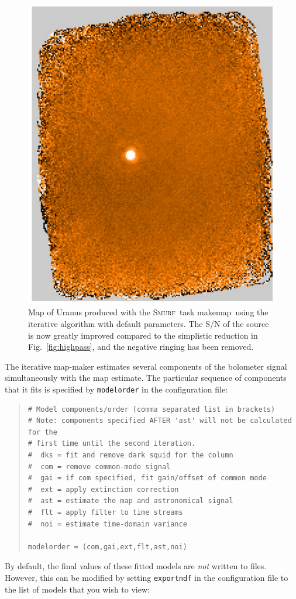 \documentclass[twoside,11pt]{article}
\newcommand{\xref}[3]{#1}
\renewcommand{\_}{\texttt{\symbol{95}}}
\newenvironment{myquote}{\begin{quote}\begin{small}}{\end{small}\end{quote}}
\newcommand{\smurf}{\xref{\textsc{Smurf}}{sun258}{}}
\newcommand{\task}[1]{\textsf{#1}}
\newcommand{\makemap}{\xref{\task{makemap}}{sun258}{MAKEMAP}}
\begin{document}
\begin{figure}
\begin{center}
\includegraphics[width=0.5\linewidth]{sc19_map_iterate}
\caption{Map of Uranus produced with the \smurf\ task \makemap\ using
  the iterative algorithm with default parameters. The S/N of the
  source is now greatly improved compared to the simplistic reduction
  in Fig.~\ref{fig:highpass}, and the negative ringing has been
  removed.}
\label{fig:itermap}
\end{center}
\end{figure}

The iterative map-maker estimates several components of the bolometer
signal simultaneously with the map estimate. The particular sequence
of components that it fits is specified by \texttt{modelorder} in the
configuration file:

\begin{myquote}
\begin{verbatim}
# Model components/order (comma separated list in brackets)
# Note: components specified AFTER 'ast' will not be calculated for the
# first time until the second iteration.
#  dks = fit and remove dark squid for the column
#  com = remove common-mode signal
#  gai = if com specified, fit gain/offset of common mode
#  ext = apply extinction correction
#  ast = estimate the map and astronomical signal
#  flt = apply filter to time streams
#  noi = estimate time-domain variance

modelorder = (com,gai,ext,flt,ast,noi)
\end{verbatim}
\end{myquote}

By default, the final values of these fitted models are {\em not}
written to files. However, this can be modified by setting
\texttt{exportndf} in the configuration file to the list of models
that you wish to view:
\end{document}
